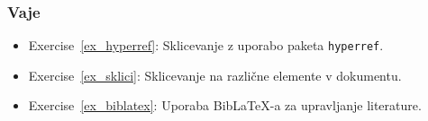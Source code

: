\begin{example}\label{eg_literatura_heading_1}\end{example}\begin{example}\label{eg_literatura_heading_2}\end{example}\begin{example}\label{eg_literatura_heading_3}\end{example}\begin{example}\label{eg_literatura_heading_4}\end{example}\begin{example}\label{eg_literatura_heading_5}\end{example}\begin{example}\label{eg_literatura_heading_6}\end{example}\begin{example}\label{eg_literatura_heading_7}\end{example}\subsubsection{Vaje}\label{latexLiteratura_vaje}

\begin{itemize}
\item Exercise~\ref{ex_hyperref}: Sklicevanje z uporabo paketa \texttt{hyperref}.
\item Exercise~\ref{ex_sklici}: Sklicevanje na različne elemente v dokumentu.
\item Exercise~\ref{ex_biblatex}: Uporaba BibLaTeX-a za upravljanje literature.
\end{itemize}

